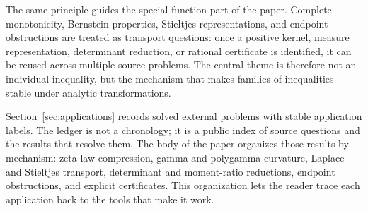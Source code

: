 \documentclass[11pt]{article}
\numberwithin{equation}{section}
\theoremstyle{definition}
\theoremstyle{remark}
\newcommand{\1}{\mathbf 1}
\begin{document}
The same principle guides the special-function part of the paper.  Complete
monotonicity, Bernstein properties, Stieltjes representations, and endpoint
obstructions are treated as transport questions: once a positive kernel,
measure representation, determinant reduction, or rational certificate is
identified, it can be reused across multiple source problems.  The central
theme is therefore not an individual inequality, but the mechanism that makes
families of inequalities stable under analytic transformations.

Section~\ref{sec:applications} records solved external problems with stable
application labels.  The ledger is not a chronology; it is a public index of
source questions and the results that resolve them.  The body of the paper
organizes those results by mechanism: zeta-law compression, gamma and
polygamma curvature, Laplace and Stieltjes transport, determinant and
moment-ratio reductions, endpoint obstructions, and explicit certificates.
This organization lets the reader trace each application back to the tools
that make it work.
\end{document}
